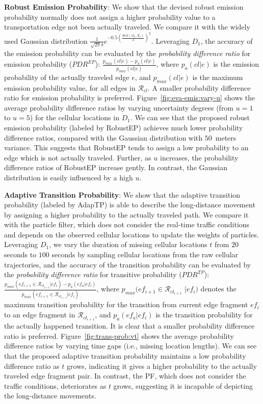 \documentclass{vldb}
\begin{document}
	\textbf{Robust Emission Probability}: We show that the devised robust emission probability normally does not assign a higher probability value to a transportation edge not been actually traveled. 
	We compare it with the widely used Gaussian distribution $\frac{1}{\sqrt{2\pi}\delta}e^{-0.5(\frac{dist(cl_t,X_t)}{\delta})^2}$.
	Leveraging $D_1$, the accuracy of the emission probability can be evaluated by the {\em probability difference ratio} for emission probability ($PDR^{EP}$): $\frac{p_{max}(cl|e)-p_{a}(cl|e)}{p_{max}(cl|e)}$, where $p_{a}(cl|e)$ is the emission probability of the actually traveled edge $e$, and $p_{max}(cl|e)$ is the maximum emission probability value, for all edges in $\mathcal{R}_{cl}$.
	A smaller probability difference ratio for emission probability is preferred.
	Figure~\ref{fig:eva-emis:vary-u} shows the average  probability difference ratios by varying uncertainty degrees (from $u=1$ to $u=5$) for the cellular locations in $D_1$.
	We can see that the proposed robust emission probability (labeled by RobustEP) achieves much lower probability difference ratios, compared with the Gaussian distribution with $50$~meters variance. This suggests that RobustEP tends to assign a low probability to an edge which is not actually traveled.
	Further, as $u$ increases, the probability difference ratios of RobustEP increase gently. In contrast, the Gaussian distribution is easily influenced by a high $u$. 
	
	
	\textbf{Adaptive Transition Probability}: We show that the adaptive transition probability (labeled by AdapTP) is able to describe the long-distance movement by assigning a higher probability to the actually traveled path.
	We compare it with the particle filter, which does not consider the real-time traffic conditions and depends on the observed cellular locations to update the weights of particles.
	Leveraging $D_1$,  we vary the duration of missing cellular locations $t$ from $20$ seconds to $100$ seconds by sampling cellular locations from the raw cellular trajectories, and the accuracy of the transition probability can be evaluated by the {\em probability difference ratio}  for transitive probability ($PDR^{TP}$): $\frac{p_{max}(ef_{i+1}\in \mathcal{R}_{cl_{i+1}}|ef_i)-p_{a}(ef_{a}|ef_i)}{p_{max}(ef_{i+1}\in \mathcal{R}_{cl_{i+1}}|ef_i)}$, where $p_{max}(ef_{i+1}\in \mathcal{R}_{cl_{i+1}}$ $|ef_i)$ denotes the maximum transition probability for the transition from current edge fragment $ef_i$ to an edge fragment in $\mathcal{R}_{cl_{i+1}}$, and $p_{a}(ef_{a}|ef_i)$ is the transition probability for the actually happened transition.
	It is clear that a smaller probability difference ratio is preferred.
	Figure~\ref{fig:trans-prob:vt} shows the average probability difference ratios by varying time gaps (i.e., missing location lengths).
	We can see that the proposed adaptive transition probability maintains a low probability difference ratio as $t$ grows, indicating it gives a higher probability to the actually traveled edge fragment pair.
	In contrast, the PF, which does not consider the traffic conditions, deteriorates as $t$ grows, suggesting it is incapable of depicting the long-distance movements. 
	
\end{document}
